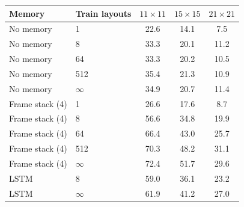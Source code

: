 \begin{tabular}{llccc}
\toprule
Memory & Train layouts & $11\times11$ & $15\times15$ & $21\times21$ \\
\midrule
No memory & 1 & 22.6 & 14.1 & 7.5 \\
No memory & 8 & 33.3 & 20.1 & 11.2 \\
No memory & 64 & 33.3 & 20.2 & 10.5 \\
No memory & 512 & 35.4 & 21.3 & 10.9 \\
No memory & $\infty$ & 34.9 & 20.7 & 11.4 \\
Frame stack (4) & 1 & 26.6 & 17.6 & 8.7 \\
Frame stack (4) & 8 & 56.6 & 34.8 & 19.9 \\
Frame stack (4) & 64 & 66.4 & 43.0 & 25.7 \\
Frame stack (4) & 512 & 70.3 & 48.2 & 31.1 \\
Frame stack (4) & $\infty$ & 72.4 & 51.7 & 29.6 \\
LSTM & 8 & 59.0 & 36.1 & 23.2 \\
LSTM & $\infty$ & 61.9 & 41.2 & 27.0 \\
\bottomrule
\end{tabular}
